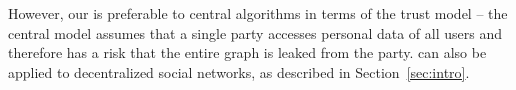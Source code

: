 However, our \AlgWSTriVR{} is preferable to central algorithms in terms of the trust model -- the central model assumes that a single party accesses personal data of all users and therefore has a risk that the entire graph is leaked from the party. 
\AlgWSTriVR{} can also be applied to decentralized social networks, as described in Section~\ref{sec:intro}. 




